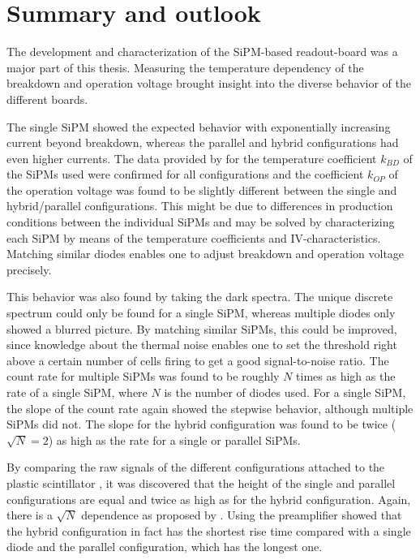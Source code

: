 \chapter{Summary and outlook}

The development and characterization of the SiPM-based readout-board was a major part of this thesis. Measuring the temperature dependency of the breakdown and operation voltage brought insight into the diverse behavior of the different boards.\par 
The single SiPM showed the expected behavior with exponentially increasing current beyond breakdown, whereas the parallel and hybrid configurations had even higher currents. The data provided by  for the temperature coefficient $k_{BD}$ of the SiPMs used were confirmed for all configurations and the coefficient $k_{OP}$ of the operation voltage was found to be slightly different between the single and hybrid/parallel configurations. This might be due to  differences in production conditions between the individual SiPMs and may be solved by characterizing each SiPM by means of the temperature coefficients and IV-characteristics. Matching similar diodes enables one to adjust breakdown and operation voltage precisely. \par 
This behavior was also found by taking the dark spectra. The unique discrete spectrum could only be found for a single SiPM, whereas multiple diodes only showed a blurred picture. By matching similar SiPMs, this could be improved, since knowledge about the thermal noise enables one to set the threshold right above a certain number of cells firing to get a good signal-to-noise ratio. The count rate for multiple SiPMs was found to be roughly $N$ times as high as the rate of a single SiPM, where $N$ is the number of diodes used. For a single SiPM, the slope of the count rate again showed the stepwise behavior, although multiple SiPMs did not. The slope for the hybrid configuration was found to be twice ($\sqrt{N}=2$) as high as the rate for a single or parallel SiPMs. \par 
By comparing the raw signals of the different configurations attached to the plastic scintillator , it was discovered that the height of the single and parallel configurations are equal and twice as high as for the hybrid configuration. Again, there is a $\sqrt{N}$ dependence as proposed by \cite{sebastian}. Using the preamplifier showed that the hybrid configuration in fact has the shortest rise time compared with a single diode and the parallel configuration, which has the longest one. \par 
